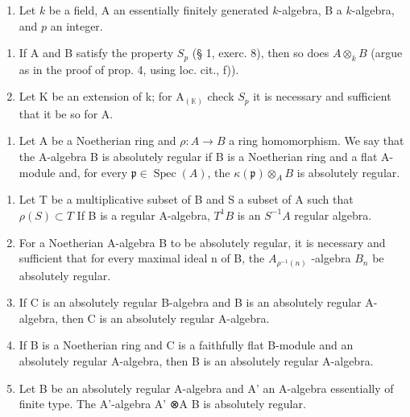 \begin{enumerate}
\def\labelenumi{\arabic{enumi})}
\setcounter{enumi}{1}
\tightlist
\item
  Let \(k\) be a field, A an essentially finitely generated \(k\)-algebra, B a \(k\)-algebra, and \(p\) an integer.
\end{enumerate}

\begin{enumerate}
\def\labelenumi{\alph{enumi})}
\item
  If A and B satisfy the property \(S_{p}\) (§ 1, exerc. 8), then so does \(A \otimes_{k} B\) (argue as in the proof of prop. 4, using loc. cit., f)).
\item
  Let K be an extension of k; for \(\mathrm{A}_{(\mathbb{K})}\) check \(S_{p}\) it is necessary and sufficient that it be so for A.
\end{enumerate}

\begin{enumerate}
\def\labelenumi{\arabic{enumi})}
\setcounter{enumi}{2}
\tightlist
\item
  Let A be a Noetherian ring and \(\rho : A \to B\) a ring homomorphism. We say that the A-algebra B is absolutely regular if B is a Noetherian ring and a flat A-module and, for every \(\mathfrak{p} \in \operatorname{Spec}(A)\), the \(\kappa(\mathfrak{p}) \otimes_{A} B\) is absolutely regular.
\end{enumerate}

\begin{enumerate}
\def\labelenumi{\alph{enumi})}
\item
  Let T be a multiplicative subset of B and S a subset of A such that \(\rho(S) \subset T\) If B is a regular A-algebra, \(T^{1}B\) is an \(S^{-1}A\) regular algebra.
\item
  For a Noetherian A-algebra B to be absolutely regular, it is necessary and sufficient that for every maximal ideal n of B, the \(A_{\rho^{-1}(n)}\) -algebra \(B_{n}\) be absolutely regular.
\item
  If C is an absolutely regular B-algebra and B is an absolutely regular A-algebra, then C is an absolutely regular A-algebra.
\item
  If B is a Noetherian ring and C is a faithfully flat B-module and an absolutely regular A-algebra, then B is an absolutely regular A-algebra.
\item
  Let B be an absolutely regular A-algebra and A' an A-algebra essentially of finite type. The A'-algebra A' ⊗A B is absolutely regular.
\end{enumerate}

